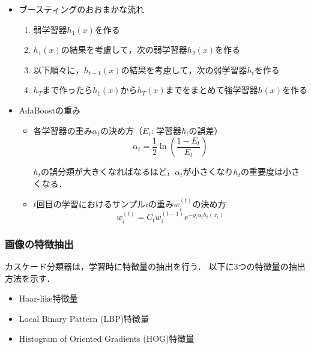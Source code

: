 \begin{itemize}
    \item ブースティングのおおまかな流れ\cite{suugaku}
        \begin{enumerate}
            \item $弱学習器h_1(x)を作る$
            \item $h_1(x)の結果を考慮して，次の弱学習器h_2(x)を作る$
            \item $以下順々に，h_{t-1}(x)の結果を考慮して，次の弱学習器h_tを作る$
            \item $h_Tまで作ったらh_1(x)からh_T(x)までをまとめて強学習器h(x)を作る$
        \end{enumerate}
        \clearpage
    
    \item AdaBoostの重み
        \begin{itemize}
            \item 各学習器の重み$\alpha_t$の決め方（$E_t$: 学習器$h_t$の誤差）
                \begin{equation}
                    \alpha_t=\frac{1}{2}\ln(\frac{1-E_t}{E_t})
                \end{equation}
                

                $h_t$の誤分類が大きくなればなるほど，$\alpha_t$が小さくなり$h_t$の重要度は小さくなる．

            \item $t$回目の学習におけるサンプル$i$の重み$w_i^{(t)}$の決め方
                \begin{equation}
                    w_i^{(t)}=C_tw_i^{(t-1)}e^{-y_i\alpha_th_t(x_i)}
                \end{equation}
            
        \end{itemize}
\end{itemize}


\subsubsection{画像の特徴抽出}
カスケード分類器は，学習時に特徴量の抽出を行う． 
以下に3つの特徴量の抽出方法を示す．

\begin{itemize}
    \item Haar-like特徴量
    \item Local Binary Pattern (LBP)特徴量
    \item Histogram of Oriented Gradients (HOG)特徴量
\end{itemize}

